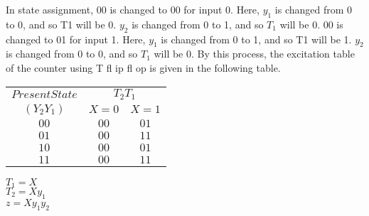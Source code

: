 \documentclass[9pt]{beamer}
\begin{document}
\begin{frame}
\hspace*{0.2cm} In state assignment, 00 is changed to 00 for input 0. Here, $y_1$ is changed from 0 to 0, and so T1 will be 0.
$y_2$ is changed from 0 to 1, and so $T_1$ will be 0. 00 is changed to 01 for input 1. Here, $y_1$ is changed from 0
to 1, and so T1 will be 1. $y_2$ is changed from 0 to 0, and so $T_1$ will be 0. By this process, the excitation table
of the counter using T fl ip fl op is given in the following table.\\

\vspace*{0.1cm}
\pause
\begin{center}
\begin{tabular}{ccc}
 \hline

 \hline

 \hline

 \hline
$Present State$ & \multicolumn{2}{c}{$T_2T_1$}\\
 \cline{2-3}
 $(Y_2Y_1)$ &  $X=0$ & $X=1$\\
\hline
 $00$    &    $00$    &   $01$  \\
 $01$    &    $00$    &   $11$  \\
 $10$    &    $00$    &   $01$  \\
 $11$    &    $00$    &   $11$  \\

 \hline

 \hline

 \hline

 \hline
\end{tabular}
\end{center}

\pause
\begin{center}
  $T_1 = X$\\
  $T_2 = Xy_1$\\
  $z = Xy_1y_2$\\
\end{center}
\end{frame}
\end{document}
